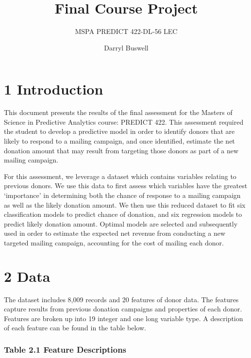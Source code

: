 \documentclass[]{article}
\title{Final Course Project}
\subtitle{MSPA PREDICT 422-DL-56 LEC}
\author{Darryl Buswell}
\date{}
\begin{document}
\maketitle

\section{1 Introduction}\label{introduction}

This document presents the results of the final assessment for the
Masters of Science in Predictive Analytics course: PREDICT 422. This
assessment required the student to develop a predictive model in order
to identify donors that are likely to respond to a mailing campaign, and
once identified, estimate the net donation amount that may result from
targeting those donors as part of a new mailing campaign.

For this assessment, we leverage a dataset which contains variables
relating to previous donors. We use this data to first assess which
variables have the greatest `importance' in determining both the chance
of response to a mailing campaign as well as the likely donation amount.
We then use this reduced dataset to fit six classification models to
predict chance of donation, and six regression models to predict likely
donation amount. Optimal models are selected and subsequently used in
order to estimate the expected net revenue from conducting a new
targeted mailing campaign, accounting for the cost of mailing each
donor.

\section{2 Data}\label{data}

The dataset includes 8,009 records and 20 features of donor data. The
features capture results from previous donation campaigns and properties
of each donor. Features are broken up into 19 integer and one long
variable type. A description of each feature can be found in the table
below.

\subsubsection{Table 2.1 Feature
Descriptions}\label{table-2.1-feature-descriptions}
\end{document}
